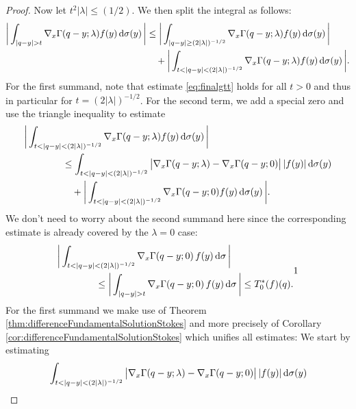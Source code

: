 \begin{proof}
  \newpage
  Now let $t^2 |\lambda| \leq ({1}/{2})$.
  We then split the integral as follows:
  \begin{align*}
    \bigg| \int_{|q - y| > t} \nabla_x \Gamma(q - y; \lambda) f(y) \, {\operatorname{d}\!{\sigma}}(y) \, \bigg| 
     &\leq \bigg| \int_{|q -y | \geq (2|\lambda|)^{-1/2}} \nabla_x\Gamma(q - y; \lambda)f(y) \, {\operatorname{d}\!{\sigma}}(y)\, \bigg| \\
     &\quad + \bigg| \int_{t < |q - y| < (2|\lambda|)^{-1/2}} \nabla_x\Gamma(q - y; \lambda)f(y) \, {\operatorname{d}\!{\sigma}}(y)\, \bigg|.
  \end{align*}
  For the first summand, note that estimate \eqref{eq:finalgtt} holds for all $t > 0$ and thus in particular for  $t = (2|\lambda|)^{-1/2}$.
  For the second term, we add a special zero and use the triangle inequality to estimate
  \begin{align*}
    &\bigg| \int_{t < |q - y| < (2|\lambda|)^{-1/2}} \nabla_x\Gamma(q - y; \lambda)f(y) \, {\operatorname{d}\!{\sigma}}(y) \,\bigg| \\
     &\qquad\qquad\leq \int_{t < |q - y| < (2|\lambda|)^{-1/2}} \big|\nabla_x\Gamma(q - y; \lambda) - \nabla_x\Gamma(q - y; 0) \big| \, |f(y)| \, {\operatorname{d}\!{\sigma}}(y) \\
     &\qquad\qquad\quad + \bigg| \int_{t < |q - y| < (2|\lambda|)^{-1/2}} \nabla_x\Gamma(q - y; 0) f(y)  \, {\operatorname{d}\!{\sigma}}(y)\, \bigg|.
  \end{align*}
  We don't need to worry about the second summand here since the corresponding estimate is already covered by the $\lambda = 0$ case:
  \begin{align}
    \label{eq:lambda0case}
    \begin{alignedat}{1}
     &\bigg| \int_{t < |q - y| < (2|\lambda|)^{-1/2}} \nabla_x\Gamma(q - y; 0) \, f(y)  \, {\operatorname{d}\!{\sigma}}\, \bigg| \\
      &\qquad\qquad \leq \bigg| \int_{|q - y| > t} \nabla_x\Gamma(q - y; 0) \, f(y)  \, {\operatorname{d}\!{\sigma}} \,\bigg| 
     \leq T_0^*(f)(q).
    \end{alignedat}{1}
   \end{align}
   For the first summand we make use of Theorem \ref{thm:differenceFundamentalSolutionStokes} and more precisely of Corollary \ref{cor:differenceFundamentalSolutionStokes} which unifies all estimates: We start by estimating
   \begin{align}
     \label{eq:estDiff}
     \begin{alignedat}{1}
       &\int_{t < |q - y| < (2|\lambda|)^{-1/2}} \big|\nabla_x\Gamma(q - y; \lambda) - \nabla_x\Gamma(q - y; 0) \big| \, |f(y)| \d\sigma(y) \\

\end{alignedat}
\end{align}
\end{proof}
